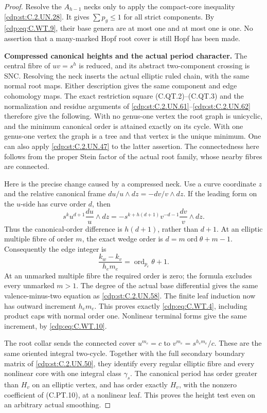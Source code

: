\begin{proof}
Resolve the \(A_{h-1}\) necks only to apply
the compact-core inequality \ref{cdp:st:C.2.UN.28}. It gives
\(\sum p_g\le1\) for all strict components.
By \eqref{cdp:eq:C.WT.9}, their base genera are at most one
and at most one is one. No assertion that
a many-marked Hopf root cover is still Hopf
has been made.

\par\medskip\noindent\textbf{Compressed canonical heights and the actual period character.}
The central fibre of \(uv=s^h\) is reduced,
and its abstract two-component crossing is
SNC. Resolving the neck inserts the actual
elliptic ruled chain, with the same normal
root maps. Either description gives the
same component and edge cohomology maps.
The exact restriction square (C.QT.2)--(C.QT.3)
and the normalization and residue arguments
of \ref{cdp:st:C.2.UN.61}--\ref{cdp:st:C.2.UN.62} therefore give the following.
With no genus-one vertex the root graph is
unicyclic, and the minimum canonical order
is attained exactly on its cycle. With one
genus-one vertex the graph is a tree and
that vertex is the unique minimum. One can
also apply \ref{cdp:st:C.2.UN.47} to the latter assertion.
The connectedness here follows from the
proper Stein factor of the actual root
family, whose nearby fibres are connected.

Here is the precise change caused by a
compressed neck. Use a curve coordinate
\(z\) and the relative canonical frame
\(du/u\wedge dz=-dv/v\wedge dz\).
If the leading form on the \(u\)-side has
curve order \(d\), then
\[
 s^k u^{d+1}\frac{du}{u}\wedge dz
      =-s^{k+h(d+1)}v^{-d-1}
                         \frac{dv}{v}\wedge dz .
 \tag{C.WT.12}\label{cdp:eq:C.WT.12}
\]
Thus the canonical-order difference is
\(h(d+1)\), rather than \(d+1\).
At an elliptic multiple fibre of order \(m\),
the exact wedge order is
\(d=m\operatorname{ord}\theta+m-1\).
Consequently the edge integer is
\[
       \frac{k_w-k_v}{h_e m_e}
                        =\operatorname{ord}_{p_e}\theta+1.
 \tag{C.WT.13}\label{cdp:eq:C.WT.13}
\]
At an unmarked multiple fibre the required
order is zero; the formula excludes every
unmarked \(m>1\). The degree of the actual
base differential gives the same
valence-minus-two equation as \ref{cdp:st:C.2.UN.58}.
The finite leaf induction now has outward
increment \(h_e m_e\). This proves exactly
\eqref{cdp:eq:C.WT.4}, including product caps with
normal order one. Nonlinear terminal
forms give the same increment, by \eqref{cdp:eq:C.WT.10}.

The root collar sends the connected cover
\(u^{m_e}=c\) to
\(v^{m_e}=s^{h_e m_e}/c\). These are the
same oriented integral two-cycle. Together
with the full secondary boundary matrix
of \ref{cdp:st:C.2.UN.50}, they identify every regular
elliptic fibre and every nonlinear core
with one integral class \(\gamma_s\).
The canonical period has order greater
than \(H_v\) on an elliptic vertex, and
has order exactly \(H_v\), with the
nonzero coefficient of (C.PT.10), at a
nonlinear leaf. This proves the height
test even on an arbitrary actual
smoothing.


\end{proof}
